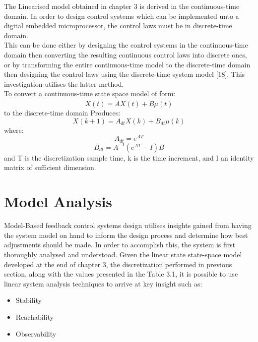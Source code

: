 \documentclass[12pt,a4paper,twoside]{report}
\begin{document}
			The Linearised model obtained in chapter 3 is derived in the continuous-time domain. In order to design control systems which can be implemented unto a digital embedded microprocessor, the control laws must be in discrete-time domain.
			\\
			This can be done either by designing the control systems in the continuous-time domain then converting the resulting continuous control laws into discrete ones, or by transforming the entire continuous-time model to the discrete-time domain then designing the control laws using the discrete-time system model [18]. This investigation utilises the latter method.
			\\
			To convert a continuous-time state space model of form:
			\[
				\dot{X(t)} = AX(t) + B\mu(t)
			\]
			to the discrete-time domain Produces:
			\begin{equation}
				X(k+1) = A_{dt}X(k) + B_{dt}\mu(k)
			\end{equation}
			where:
			\begin{equation}
				A_{dt} = e^{AT} 
			\end{equation}
			\begin{equation}
				B_{dt} = A^{-1}(e^{AT} - I)B
			\end{equation}
			\space
			and T is the discretization sample time, k is the time increment, and I an identity matrix of sufficient dimension.
			
		\section{Model Analysis}
			
			Model-Based feedback control systems design utilises insights gained from having the system model on hand to inform the design process and determine how best adjustments should be made. In order to accomplish this, the system is first thoroughly analysed and understood. Given the linear state state-space model developed at the end of chapter 3, the discretization performed in previous section, along with the values presented in the Table 3.1, it is possible to use linear system analysis techniques to arrive at key insight such as:
			
			\begin{itemize}
				\item 
					Stability
				\item 
					Reachability
				\item
					Observability
			\end{itemize}
		
\end{document}
